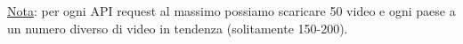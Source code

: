 \underline{Nota}: per ogni API request al massimo possiamo scaricare 50 video e ogni paese a un numero diverso di video in tendenza (solitamente 150-200).

